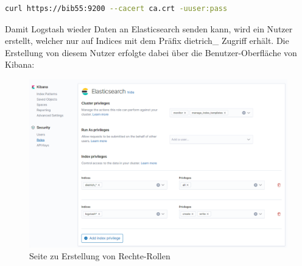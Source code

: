 \begin{lstlisting}[language=BASH, frame=single, label={lst:curlQuery}, caption=Curl-Abfrage an das Elasticsearch-System,captionpos=b] 
curl https://bib55:9200 --cacert ca.crt -uuser:pass
\end{lstlisting}

Damit Logstash wieder Daten an Elasticsearch senden kann, wird ein Nutzer erstellt, welcher nur auf Indices mit dem Präfix dietrich\_ Zugriff erhält. Die Erstellung von diesem Nutzer erfolgte dabei über die Benutzer-Oberfläche von Kibana: 

\begin{figure}
	\centering
	\includegraphics[width=1\linewidth]{images/setup/kibana_roles.png}
	\caption{Seite zu Erstellung von Rechte-Rollen}
	\label{img:kibanaRoles}
\end{figure}